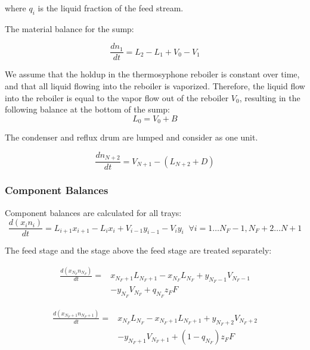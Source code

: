 where $q_i$ is the liquid fraction of the feed stream.

The material balance for the sump:

\begin{equation}
    \frac{dn_1}{dt} = L_2 - L_1 + V_0 - V_1
\end{equation}

We assume that the holdup in the thermosyphone reboiler is constant over time, and that all liquid flowing into the reboiler is vaporized. Therefore, the liquid flow into the reboiler is equal to the vapor flow out of the reboiler $V_0$, resulting in the following balance at the bottom of the sump:
\begin{equation}
    L_0 = V_0 + B
\end{equation}

The condenser and reflux drum are lumped and consider as one unit.

\begin{equation}
    \frac{dn_{N+2}}{dt} = V_{N+1}-(L_{N+2} + D)    
\end{equation}


\subsubsection{Component Balances}

Component balances are calculated for all trays:
\begin{equation}
   \frac{d(x_{i} n_{i})}{dt}= L_{i+1} x_{i+1} - L_i x_{i} + V_{i-1} y_{i-1} -V_i y_i  \;\; \forall i=1 \dots N_F-1, N_F+2 \dots N+1
\end{equation}

The  feed stage and the stage above the feed stage are treated separately:

\begin{equation}
\begin{split}
 \frac{d(x_{N_F} n_{N_F})}{dt} =  &  x_{N_F+1}L_{N_F+1}  - x_{N_F}L_{N_F} +  y_{N_F-1}V_{N_F-1} \\ & -y_{N_F}V_{N_F} + q_{N_F}z_FF   
\end{split}
\end{equation}

\begin{equation}
\begin{split}
    \frac{d(x_{N_F+1} n_{N_F+1})}{dt} =  & x_{N_F}L_{N_F} - x_{N_F+1}L_{N_F+1} +  y_{N_F+2}V_{N_F+2}   \\ & -y_{N_F+1}V_{N_F+1}  + (1-q_{N_F})z_FF 
\end{split}
\end{equation}

